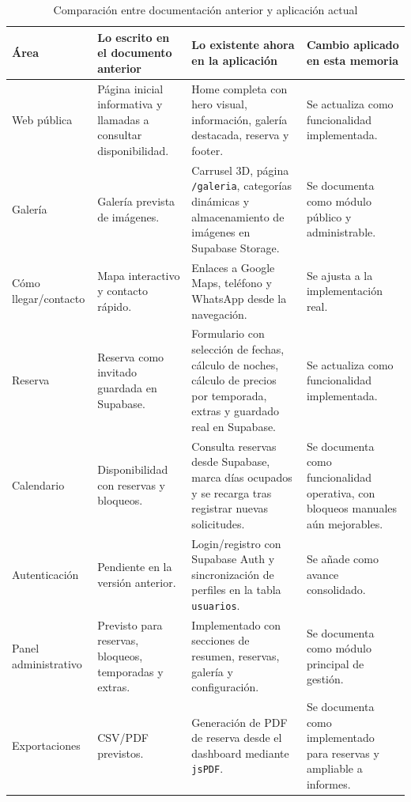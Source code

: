 \documentclass[11pt,a4paper]{article}
\begin{document}
\begin{table}[H]
\centering
\small
\begin{tabularx}{\textwidth}{|p{2.6cm}|p{3.2cm}|p{3.2cm}|p{5.2cm}|}
\hline
\textbf{Área} & \textbf{Lo escrito en el documento anterior} & \textbf{Lo existente ahora en la aplicación} & \textbf{Cambio aplicado en esta memoria} \\
\hline
Web pública & Página inicial informativa y llamadas a consultar disponibilidad. & Home completa con hero visual, información, galería destacada, reserva y footer. & Se actualiza como funcionalidad implementada. \\
\hline
Galería & Galería prevista de imágenes. & Carrusel 3D, página \texttt{/galeria}, categorías dinámicas y almacenamiento de imágenes en Supabase Storage. & Se documenta como módulo público y administrable. \\
\hline
Cómo llegar/contacto & Mapa interactivo y contacto rápido. & Enlaces a Google Maps, teléfono y WhatsApp desde la navegación. & Se ajusta a la implementación real. \\
\hline
Reserva & Reserva como invitado guardada en Supabase. & Formulario con selección de fechas, cálculo de noches, cálculo de precios por temporada, extras y guardado real en Supabase. & Se actualiza como funcionalidad implementada. \\
\hline
Calendario & Disponibilidad con reservas y bloqueos. & Consulta reservas desde Supabase, marca días ocupados y se recarga tras registrar nuevas solicitudes. & Se documenta como funcionalidad operativa, con bloqueos manuales aún mejorables. \\
\hline
Autenticación & Pendiente en la versión anterior. & Login/registro con Supabase Auth y sincronización de perfiles en la tabla \texttt{usuarios}. & Se añade como avance consolidado. \\
\hline
Panel administrativo & Previsto para reservas, bloqueos, temporadas y extras. & Implementado con secciones de resumen, reservas, galería y configuración. & Se documenta como módulo principal de gestión. \\
\hline
Exportaciones & CSV/PDF previstos. & Generación de PDF de reserva desde el dashboard mediante \texttt{jsPDF}. & Se documenta como implementado para reservas y ampliable a informes. \\
\hline
\end{tabularx}
\caption{Comparación entre documentación anterior y aplicación actual}
\end{table}
\end{document}
